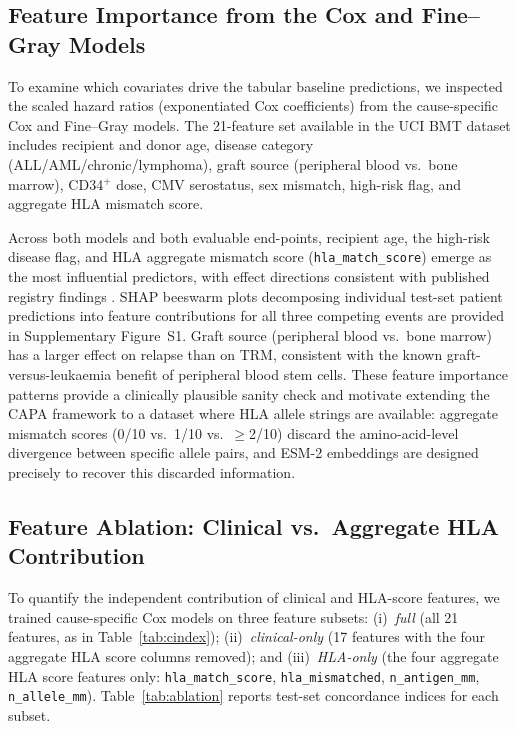 \documentclass[11pt,a4paper]{article}
\begin{document}
\subsection{Feature Importance from the Cox and Fine--Gray Models}

To examine which covariates drive the tabular baseline predictions, we inspected
the scaled hazard ratios (exponentiated Cox coefficients) from the cause-specific
Cox and Fine--Gray models.  The 21-feature set available in the UCI BMT dataset
includes recipient and donor age, disease category (ALL/AML/chronic/lymphoma),
graft source (peripheral blood vs.\ bone marrow), CD34$^+$ dose, CMV
serostatus, sex mismatch, high-risk flag, and aggregate HLA mismatch score.

Across both models and both evaluable end-points, recipient age, the high-risk
disease flag, and HLA aggregate mismatch score (\texttt{hla\_match\_score})
emerge as the most influential predictors, with effect directions consistent with
published registry findings \citep{gratwohl2009risk, lee2007hlamismatch}.
SHAP \citep{lundberg2017shap} beeswarm plots decomposing individual
test-set patient predictions into feature contributions for all three
competing events are provided in Supplementary Figure~S1.
Graft source (peripheral blood vs.\ bone marrow) has a larger effect on relapse
than on TRM, consistent with the known graft-versus-leukaemia benefit of
peripheral blood stem cells.  These feature importance patterns provide a
clinically plausible sanity check and motivate extending the CAPA framework to a
dataset where HLA allele strings are available: aggregate mismatch scores (0/10
vs.\ 1/10 vs.\ $\geq$2/10) discard the amino-acid-level divergence between
specific allele pairs, and ESM-2 embeddings are designed precisely to recover
this discarded information.

\subsection{Feature Ablation: Clinical vs.\ Aggregate HLA Contribution}
\label{sec:ablation}

To quantify the independent contribution of clinical and HLA-score features, we
trained cause-specific Cox models on three feature subsets:
(i)~\emph{full} (all 21 features, as in Table~\ref{tab:cindex});
(ii)~\emph{clinical-only} (17 features with the four aggregate HLA score
columns removed); and (iii)~\emph{HLA-only} (the four aggregate HLA score
features only: \texttt{hla\_match\_score}, \texttt{hla\_mismatched},
\texttt{n\_antigen\_mm}, \texttt{n\_allele\_mm}).  Table~\ref{tab:ablation}
reports test-set concordance indices for each subset.
\end{document}
